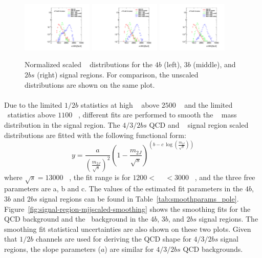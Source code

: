 \begin{figure}[htbp!]
\begin{center}
\includegraphics[width=0.3\textwidth,angle=-90]{figures/boosted/Other/FourTag_Signal_compare_scale_mHH_1.pdf}
\includegraphics[width=0.3\textwidth,angle=-90]{figures/boosted/Other/ThreeTag_Signal_compare_scale_mHH_1.pdf}
\includegraphics[width=0.3\textwidth,angle=-90]{figures/boosted/Other/TwoTag_split_Signal_compare_scale_mHH_1.pdf}
\caption{Normalized scaled \mtwoJ~ distributions for the $4b$ (left), $3b$ (middle), and $2bs$ (right) signal regions. For comparison, the unscaled  \mtwoJ~ distributions are shown on the same plot. }
\label{fig:signal-region-bkg-scaled}
\end{center}
\end{figure}

\paragraph{} 
Due to the limited $1/2b$ statistics at high \mtwoJ~ above $2500$ \GeV~ and the limited \ttbar\ statistics above $1100$ \GeV~, different fits are performed to smooth the \mtwoJ~ mass distribution in the signal region. 
The $4/3/2bs$ QCD and \ttbar~ signal region scaled \mtwoJ~ distributions are fitted with the following functional form:
\begin{equation}
\label{eq:boosted_dijet}
y = \frac{a}{(\frac{m_{2J}}{\sqrt{s}})^2} (1-\frac{m_{2J}}{\sqrt{s}})^{(b - c\ \log(\frac{m_{2J}}{\sqrt{s}}))}
\end{equation}
where $\sqrt{s} = 13000$ \GeV~, the fit range is for $1200 <$ \mtwoJ~ $< 3000$ \GeV~, and the three free parameters are a, b and c.
The values of the estimated fit parameters in the $4b$, $3b$ and $2bs$ signal regions can be found in Table~\ref{tab:smoothparams_pole}.
Figure~\ref{fig:signal-region-mjjscaled-smoothing} shows the smoothing fits for the QCD background and the \ttbar\ background in the $4b$, $3b$, and $2bs$ signal regions.
The smoothing fit statistical uncertainties are also shown on these two plots. 
Given that $1/2b$ channels are used for deriving the QCD shape for $4/3/2bs$ signal regions, the slope parameters ($a$) are similar for $4/3/2bs$ QCD backgrounds.

